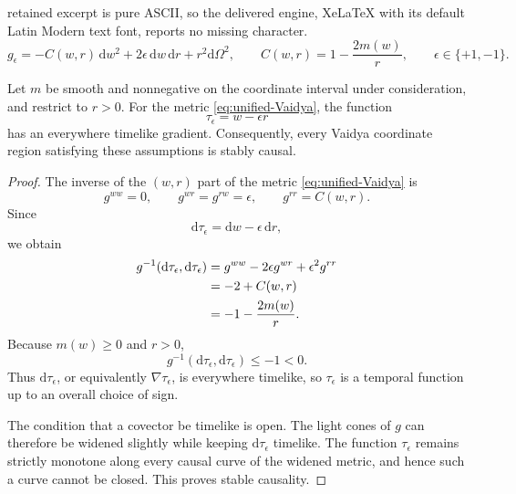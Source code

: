 \documentclass[10pt,a4paper]{amsart}
\newcommand{\dd}{\mathrm d}
\begin{document}
retained excerpt is pure ASCII, so the delivered engine, XeLaTeX with its default Latin Modern text font, reports no missing character.
	\begin{equation}
		g_{\epsilon}
		=-C(w,r)\,\dd w^2+2\epsilon\,\dd w\,\dd r+r^2\dd\Omega^2,
		\qquad
		C(w,r)=1-\frac{2m(w)}{r},
		\qquad \epsilon\in\{+1,-1\}.
		\label{eq:unified-Vaidya}
	\end{equation}

	\begin{proposition}
		Let $m$ be smooth and nonnegative on the coordinate interval under
		consideration, and restrict to $r>0$.  For the metric
		\eqref{eq:unified-Vaidya}, the function
		\begin{equation}
			\tau_\epsilon=w-\epsilon r
			\label{eq:temporal-function}
		\end{equation}
		has an everywhere timelike gradient.  Consequently, every Vaidya coordinate
		region satisfying these assumptions is stably causal.
	\end{proposition}

	\begin{proof}
		The inverse of the $(w,r)$ part of the metric
		\eqref{eq:unified-Vaidya} is
		\begin{equation}
			g^{ww}=0,
			\qquad
			g^{wr}=g^{rw}=\epsilon,
			\qquad
			g^{rr}=C(w,r).
		\end{equation}
		Since
		\[
		\dd\tau_\epsilon=\dd w-\epsilon\,\dd r,
		\]
		we obtain
		\begin{align}
			g^{-1}(\dd\tau_\epsilon,\dd\tau_\epsilon)
			&=
			g^{ww}
			-2\epsilon g^{wr}
			+\epsilon^2g^{rr}\notag\\
			&=
			-2+C(w,r)\notag\\
			&=
			-1-\frac{2m(w)}r.
			\label{eq:temporal-calculation}
		\end{align}
		Because $m(w)\geq0$ and $r>0$,
		\[
		g^{-1}(\dd\tau_\epsilon,\dd\tau_\epsilon)
		\leq-1<0.
		\]
		Thus $\dd\tau_\epsilon$, or equivalently
		$\nabla\tau_\epsilon$, is everywhere timelike, so
		$\tau_\epsilon$ is a temporal function up to an overall choice of sign.
		
		The condition that a covector be timelike is open.  The light cones of $g$
		can therefore be widened slightly while keeping
		$\dd\tau_\epsilon$ timelike.  The function $\tau_\epsilon$ remains strictly
		monotone along every causal curve of the widened metric, and hence such a
		curve cannot be closed.  This proves stable causality.
	\end{proof}
\end{document}
